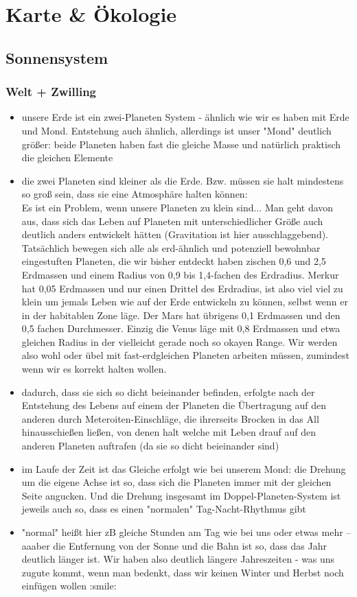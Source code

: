 \section{Karte \& Ökologie}
\subsection{Sonnensystem}
\subsubsection{Welt + Zwilling}
\begin{itemize}
	\item unsere Erde ist ein zwei-Planeten System - ähnlich wie wir es haben mit Erde und Mond. Entstehung auch ähnlich, allerdings ist unser "Mond" deutlich größer: beide Planeten haben fast die gleiche Masse und natürlich praktisch die gleichen Elemente
	\item die zwei Planeten sind kleiner als die Erde. Bzw. müssen sie halt mindestens so groß sein, dass sie eine Atmosphäre halten können: \\
	Es ist ein Problem, wenn unsere Planeten zu klein sind... Man geht davon aus, dass sich das Leben auf Planeten mit unterschiedlicher Größe auch deutlich anders entwickelt hätten (Gravitation ist hier ausschlaggebend). Tatsächlich bewegen sich alle als erd-ähnlich und potenziell bewohnbar eingestuften Planeten, die wir bisher entdeckt haben zischen 0,6 und 2,5 Erdmassen und einem Radius von 0,9 bis 1,4-fachen des Erdradius. Merkur hat 0,05 Erdmassen und nur einen Drittel des Erdradius, ist also viel viel zu klein um jemals Leben wie auf der Erde entwickeln zu können, selbst wenn er in der habitablen Zone läge. Der Mars hat übrigens 0,1 Erdmassen und den 0,5 fachen Durchmesser. Einzig die Venus läge mit 0,8 Erdmassen und etwa gleichen Radius in der vielleicht gerade noch so okayen Range. Wir werden also wohl oder übel mit fast-erdgleichen Planeten arbeiten müssen, zumindest wenn wir es korrekt halten wollen.
	\item dadurch, dass sie sich so dicht beieinander befinden, erfolgte nach der Entstehung des Lebens auf einem der Planeten die Übertragung auf den anderen durch Meteroiten-Einschläge, die ihrerseits Brocken in das All hinausschießen ließen, von denen halt welche mit Leben drauf auf den anderen Planeten auftrafen (da sie so dicht beieinander sind)
	\item im Laufe der Zeit ist das Gleiche erfolgt wie bei unserem Mond: die Drehung um die eigene Achse ist so, dass sich die Planeten immer mit der gleichen Seite angucken. Und die Drehung insgesamt im Doppel-Planeten-System ist jeweils auch so, dass es einen "normalen" Tag-Nacht-Rhythmus gibt
	\item "normal" heißt hier zB gleiche Stunden am Tag wie bei uns oder etwas mehr -- aaaber die Entfernung von der Sonne und die Bahn ist so, dass das Jahr deutlich länger ist. Wir haben also deutlich längere Jahreszeiten - was uns zugute kommt, wenn man bedenkt, dass wir keinen Winter und Herbst noch einfügen wollen :smile:
\end{itemize}

